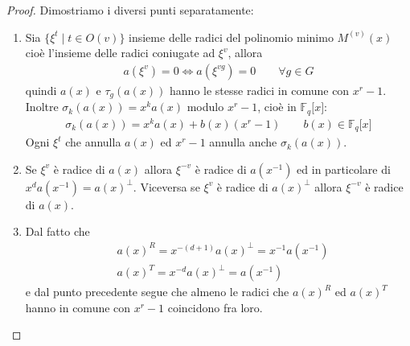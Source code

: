 \begin{proof}
   Dimostriamo i diversi punti separatamente:
   \begin{enumerate} 
      \item Sia $\lbrace \xi^{t} \mid t \in O(v) \rbrace$ insieme delle radici del polinomio minimo $M^{(v)}(x)$ cioè l'insieme delle radici coniugate ad $\xi^{v}$, allora
      \begin{align*}
         a(\xi^{v}) = 0 \iff a(\xi^{vg}) = 0 \qquad \forall g \in G
      \end{align*}
      quindi $a(x)$ e $\tau_{g}(a(x))$ hanno le stesse radici in comune con $x^r-1$. \\
      Inoltre $\sigma_{k}(a(x)) = x^ka(x)$ modulo $x^r-1$, cioè in $\mathbb{F}_{q}\lbrack x \rbrack$:
      \begin{align*}
         \sigma_{k}(a(x)) = x^ka(x) + b(x)(x^r-1)  \qquad b(x)\in \mathbb{F}_{q}\lbrack x \rbrack
      \end{align*}     
      Ogni $\xi^{t}$ che annulla $a(x)$ ed $x^r-1$ annulla anche $\sigma_{k}(a(x))$.
      \item Se $\xi^{v}$ è radice di $a(x)$ allora $\xi^{-v}$ è radice di $a(x^{-1})$ ed in particolare di $x^{d}a(x^{-1}) = a(x)^{\perp}$. Viceversa se $\xi^{v}$ è radice di $ a(x)^{\perp}$ allora $\xi^{-v}$ è radice di $a(x)$. 
      \item Dal fatto che 
        \begin{align*}
	  & a(x)^{R} = x^{-(d+1)} a(x)^{\perp} = x^{-1}a(x^{-1}) \\
	  & a(x)^{T} = x^{-d} a(x)^{\perp} = a(x^{-1})
	\end{align*}
      e dal punto precedente segue che almeno le radici che $a(x)^{R}$ ed $a(x)^{T}$ hanno in comune con $x^r -1$ coincidono fra loro.
      
      
      
      
      

\end{enumerate}
\end{proof}
